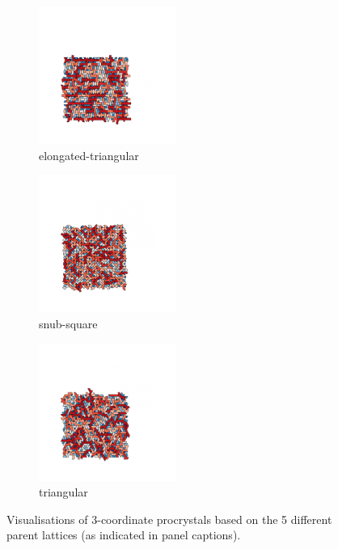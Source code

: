 \begin{figure}[bt]
     \vspace{0.5cm}
     \begin{subfigure}[b]{0.45\textwidth}
         \centering
         \includegraphics[height=4.5cm]{./figures/procrystals/pro_elong3.pdf}
         \caption{elongated\--triangular}
         \label{fig:pro3c}
     \end{subfigure}
     \begin{subfigure}[b]{0.45\textwidth}
         \centering
         \includegraphics[height=4.5cm]{./figures/procrystals/pro_snub3.pdf}
         \caption{snub\--square}
         \label{fig:pro3d}
     \end{subfigure}
     \hfill
     
     \vspace{0.5cm}     
     \begin{subfigure}[b]{0.45\textwidth}
         \centering
         \includegraphics[height=4.5cm]{./figures/procrystals/pro_tri3.pdf}
         \caption{triangular}
         \label{fig:pro3e}
     \end{subfigure}
     \hfill
    
     \caption{Visualisations of 3\--coordinate procrystals based on the 5 different parent lattices (as indicated in panel captions).}
     \label{fig:pro3}
\end{figure}

